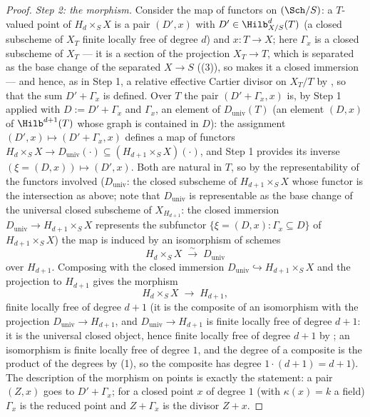 \begin{proof}
\emph{Step 2: the morphism.}  Consider the map of functors on
$(\Sch/S)$: a $T$-valued point of $H_d\times_SX$ is a pair
$(D',x)$ with $D'\in\Hilb^d_{X/S}(T)$ (a closed subscheme of $X_T$
finite locally free of degree $d$) and $x:T\to X$; here $\Gamma_x$ is a
closed subscheme of $X_T$ --- it is a section of the projection
$X_T\to T$, which is separated as the base change of the separated
$X\to S$ ((3)), so
 makes it a closed immersion ---
and hence, as in Step 1, a relative effective Cartier divisor on
$X_T/T$ by , so that the sum
$D'+\Gamma_x$ is defined.  Over $T$ the pair
$(D'+\Gamma_x,x)$ is, by Step 1 applied with $D:=D'+\Gamma_x$ and
$\Gamma_x$, an element of $D_{\mathrm{univ}}(T)$ (an element
$(D,x)$ of $\Hilb^{d+1}(T)$ whose graph is contained in $D$): the
assignment $(D',x)\mapsto(D'+\Gamma_x,x)$ defines a map of functors
$H_d\times_SX\to D_{\mathrm{univ}}(\cdot)\subseteq
(H_{d+1}\times_SX)(\cdot)$, and Step 1 provides its inverse
$(\xi=(D,x))\mapsto(D',x)$.  Both are natural in $T$, so by the
representability of the functors involved ($D_{\mathrm{univ}}$: the
closed subscheme of $H_{d+1}\times_SX$ whose functor is the
intersection as above; note that $D_{\mathrm{univ}}$ is representable
as the base change of the universal closed subscheme of
$X_{H_{d+1}}$: the closed immersion
$D_{\mathrm{univ}}\to H_{d+1}\times_SX$ represents the subfunctor
$\{\xi=(D,x):\Gamma_x\subseteq D\}$ of $H_{d+1}\times_SX$) the map
is induced by an isomorphism of schemes
\[
H_d\times_SX\;\stackrel{\sim}{\longrightarrow}\;D_{\mathrm{univ}}
\]
over $H_{d+1}$.  Composing with the closed immersion
$D_{\mathrm{univ}}\hookrightarrow H_{d+1}\times_SX$ and the projection
to $H_{d+1}$ gives the morphism
\[
H_d\times_SX\;\longrightarrow\;H_{d+1},
\]
finite locally free of degree $d+1$ (it is the composite of an
isomorphism with the projection $D_{\mathrm{univ}}\to H_{d+1}$, and
$D_{\mathrm{univ}}\to H_{d+1}$ is finite locally free of degree
$d+1$: it is the universal closed object, hence finite locally free
of degree $d+1$ by ; an isomorphism is
finite locally free of degree $1$, and the degree of a composite is
the product of the degrees by
(1), so the composite has
degree $1\cdot(d+1)=d+1$).  The description of
the morphism on points is exactly the statement: a pair $(Z,x)$
goes to $D'+\Gamma_x$; for a closed point $x$ of degree $1$ (with
$\kappa(x)=k$ a field) $\Gamma_x$ is the reduced point and
$Z+\Gamma_x$ is the divisor $Z+x$.
\end{proof}

